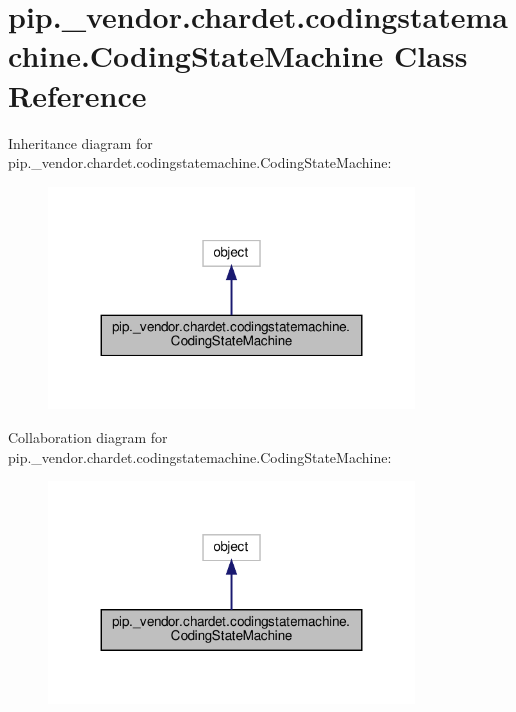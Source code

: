 \hypertarget{classpip_1_1__vendor_1_1chardet_1_1codingstatemachine_1_1CodingStateMachine}{}\section{pip.\+\_\+vendor.\+chardet.\+codingstatemachine.\+Coding\+State\+Machine Class Reference}
\label{classpip_1_1__vendor_1_1chardet_1_1codingstatemachine_1_1CodingStateMachine}


Inheritance diagram for pip.\+\_\+vendor.\+chardet.\+codingstatemachine.\+Coding\+State\+Machine\+:
\nopagebreak
\begin{figure}[H]
\begin{center}
\leavevmode
\includegraphics[width=275pt]{classpip_1_1__vendor_1_1chardet_1_1codingstatemachine_1_1CodingStateMachine__inherit__graph}
\end{center}
\end{figure}


Collaboration diagram for pip.\+\_\+vendor.\+chardet.\+codingstatemachine.\+Coding\+State\+Machine\+:
\nopagebreak
\begin{figure}[H]
\begin{center}
\leavevmode
\includegraphics[width=275pt]{classpip_1_1__vendor_1_1chardet_1_1codingstatemachine_1_1CodingStateMachine__coll__graph}
\end{center}
\end{figure}
